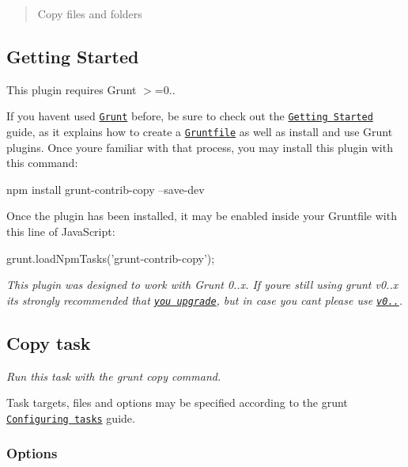 \begin{quote}
Copy files and folders \end{quote}


\subsection*{Getting Started}

This plugin requires Grunt {\ttfamily $>$=0..}

If you haven\textquotesingle{}t used \href{http://gruntjs.com/}{\tt Grunt} before, be sure to check out the \href{http://gruntjs.com/getting-started}{\tt Getting Started} guide, as it explains how to create a \href{http://gruntjs.com/sample-gruntfile}{\tt Gruntfile} as well as install and use Grunt plugins. Once you\textquotesingle{}re familiar with that process, you may install this plugin with this command\+:


\begin{DoxyCode}
npm install grunt-contrib-copy --save-dev
\end{DoxyCode}


Once the plugin has been installed, it may be enabled inside your Gruntfile with this line of Java\+Script\+:


\begin{DoxyCode}
grunt.loadNpmTasks('grunt-contrib-copy');
\end{DoxyCode}


{\itshape This plugin was designed to work with Grunt 0..\+x. If you\textquotesingle{}re still using grunt v0..\+x it\textquotesingle{}s strongly recommended that \href{http://gruntjs.com/upgrading-from-0.3-to-0.4}{\tt you upgrade}, but in case you can\textquotesingle{}t please use \href{https://github.com/gruntjs/grunt-contrib-copy/tree/grunt-0.3-stable}{\tt v0..}.}

\subsection*{Copy task}

{\itshape Run this task with the {\ttfamily grunt copy} command.}

Task targets, files and options may be specified according to the grunt \href{http://gruntjs.com/configuring-tasks}{\tt Configuring tasks} guide. \subsubsection*{Options}

